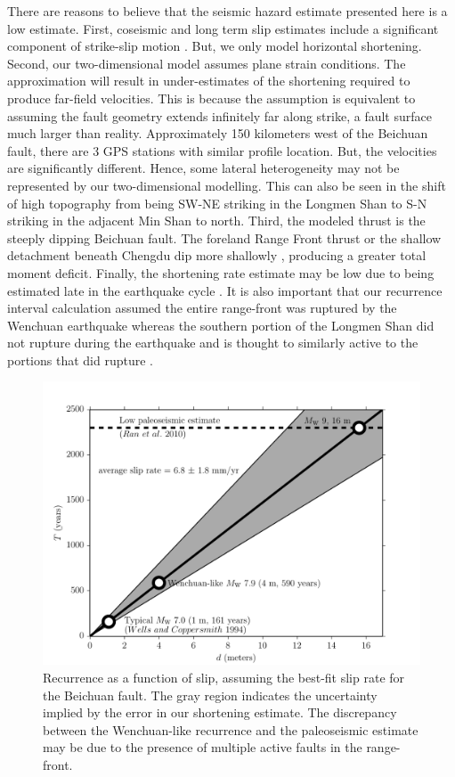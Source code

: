 \documentclass[12pt]{article}
\begin{document}
There are reasons to believe that the seismic hazard estimate presented here is a low estimate.  First, coseismic and long term slip estimates include a significant component of strike-slip motion\citep{Shen2009, Qi2011, Densmore2007} . But, we only model horizontal shortening. Second, our two-dimensional model assumes plane strain conditions. The approximation will result in under-estimates of the shortening required to produce far-field velocities. This is because the assumption is equivalent to assuming the fault geometry extends infinitely far along strike, a fault surface much larger than reality. Approximately 150 kilometers west of the Beichuan fault, there are 3 GPS stations with similar profile location. But, the velocities are significantly different. Hence, some lateral heterogeneity may not be represented by our two-dimensional modelling. This can also be seen in the shift of high topography from being SW-NE striking in the Longmen Shan to S-N striking in the adjacent Min Shan to north. Third, the modeled thrust is the steeply dipping Beichuan fault. The foreland Range Front thrust or the shallow detachment beneath Chengdu dip more shallowly \citep{Hubbard2010}, producing a greater total moment deficit.  Finally, the shortening rate estimate may be low due to being estimated late in the earthquake cycle \citep{savage00}.  It is also important that our recurrence interval calculation assumed the entire range-front was ruptured by the Wenchuan earthquake whereas the southern portion of the Longmen Shan did not rupture during the earthquake and is thought to similarly active to the portions that did rupture \citep{Li2010}. 


\begin{figure}[h!]
    \centering
    \includegraphics{figs/hazard_all_details.pdf}
    \caption{Recurrence as a function of slip, assuming the best-fit slip rate for the Beichuan fault. The gray region indicates the uncertainty implied by the error in our shortening estimate. The discrepancy between the Wenchuan-like recurrence and the paleoseismic estimate may be due to the presence of multiple active faults in the range-front.}
    \label{fig:hazard}
\end{figure}
\end{document}
